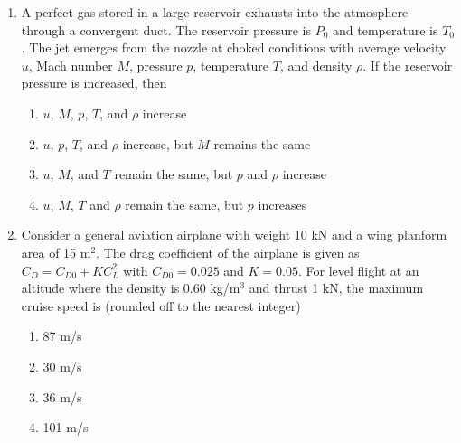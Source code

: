 \documentclass{article}
\begin{document}
\begin{enumerate}[leftmargin=*, resume]
\item A perfect gas stored in a large reservoir exhausts into the atmosphere through a convergent duct. The reservoir pressure is $P_0$ and temperature is $T_0$. The jet emerges from the nozzle at choked conditions with average velocity $u$, Mach number $M$, pressure $p$, temperature $T$, and density $\rho$. If the reservoir pressure is increased, then
\begin{multicols}{2}
\begin{enumerate}
\item $u$, $M$, $p$, $T$, and $\rho$ increase
\item $u$, $p$, $T$, and $\rho$ increase, but $M$ remains the same
\item $u$, $M$, and $T$ remain the same, but $p$ and $\rho$ increase
\item $u$, $M$, $T$ and $\rho$ remain the same, but $p$ increases
\end{enumerate}
\end{multicols}

\item Consider a general aviation airplane with weight 10 kN and a wing planform area of 15 m$^2$. The drag coefficient of the airplane is given as $C_D = C_{D0} + K C_L^2$ with $C_{D0} = 0.025$ and $K = 0.05$. For level flight at an altitude where the density is 0.60 kg/m$^3$ and thrust 1 kN, the maximum cruise speed is (rounded off to the nearest integer)
\begin{multicols}{4}
\begin{enumerate}
\item 87 m/s
\item 30 m/s
\item 36 m/s
\item 101 m/s
\end{enumerate}
\end{multicols}


\end{enumerate}
\end{document}
